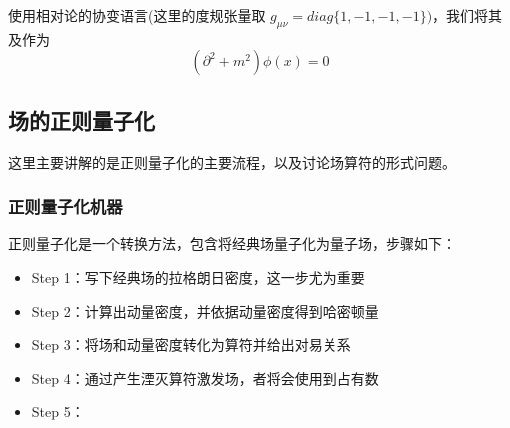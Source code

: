 \documentclass{article}
\begin{document}
使用相对论的协变语言(这里的度规张量取 $g_{\mu\nu} = diag\{1,-1,-1,-1\})$，我们将其及作为
\begin{equation*}
    \left(\partial^2 + m^2\right)\phi(x) = 0
\end{equation*}

\subsection{场的正则量子化}
这里主要讲解的是正则量子化的主要流程，以及讨论场算符的形式问题。
\subsubsection{正则量子化机器}
正则量子化是一个转换方法，包含将经典场量子化为量子场，步骤如下：
\begin{itemize}
    \item Step 1：写下经典场的拉格朗日密度，这一步尤为重要
    \item Step 2：计算出动量密度，并依据动量密度得到哈密顿量
    \item Step 3：将场和动量密度转化为算符并给出对易关系
    \item Step 4：通过产生湮灭算符激发场，者将会使用到占有数
    \item Step 5：
\end{itemize}
\end{document}

